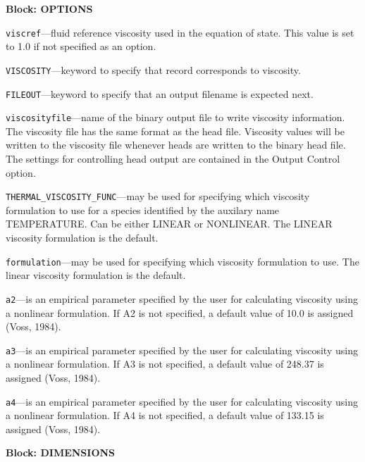 
\item \textbf{Block: OPTIONS}

\begin{description}
\item \texttt{viscref}---fluid reference viscosity used in the equation of state.  This value is set to 1.0 if not specified as an option.

\item \texttt{VISCOSITY}---keyword to specify that record corresponds to viscosity.

\item \texttt{FILEOUT}---keyword to specify that an output filename is expected next.

\item \texttt{viscosityfile}---name of the binary output file to write viscosity information.  The viscosity file has the same format as the head file.  Viscosity values will be written to the viscosity file whenever heads are written to the binary head file.  The settings for controlling head output are contained in the Output Control option.

\item \texttt{THERMAL\_VISCOSITY\_FUNC}---may be used for specifying which viscosity formulation to use for a species identified by the auxilary name TEMPERATURE. Can be either LINEAR or NONLINEAR. The LINEAR viscosity formulation is the default.

\item \texttt{formulation}---may be used for specifying which viscosity formulation to use.  The linear viscosity formulation is the default.

\item \texttt{a2}---is an empirical parameter specified by the user for calculating viscosity using a nonlinear formulation.  If A2 is not specified, a default value of 10.0 is assigned (Voss, 1984).

\item \texttt{a3}---is an empirical parameter specified by the user for calculating viscosity using a nonlinear formulation.  If A3 is not specified, a default value of 248.37 is assigned (Voss, 1984).

\item \texttt{a4}---is an empirical parameter specified by the user for calculating viscosity using a nonlinear formulation.  If A4 is not specified, a default value of 133.15 is assigned (Voss, 1984).

\end{description}
\item \textbf{Block: DIMENSIONS}

